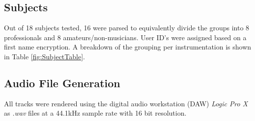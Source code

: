 \subsection{Subjects}
Out of 18 subjects tested, 16 were parsed to equivalently divide the groups into 8 professionals and 8 amateurs/non-musicians. User ID's were assigned based on a first name encryption. A breakdown of the grouping per instrumentation is shown in Table \ref{fig:SubjectTable}.
\begin{table}[t]
    \centering
    \caption{Subject Grouping}
    \label{fig:SubjectTable}
\end{table}

\subsection{Audio File Generation}
All tracks were rendered using the digital audio workstation (DAW) \textit{Logic Pro X} as \textit{.wav} files at a 44.1kHz sample rate with 16 bit resolution.

